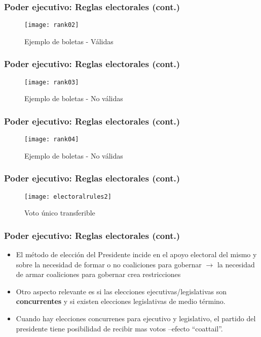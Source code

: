 \documentclass[14pt,aspectratio=169]{beamer}
\begin{document}
  \begin{frame}\frametitle{Poder ejecutivo: Reglas electorales (cont.)}
  \begin{figure}[htbp]\vspace{0cm}
    \centering
    \texttt{[image: rank02]}
    \caption{Ejemplo de boletas - Válidas}
    \label{fig:1}
  \end{figure}
  \end{frame}


  
  \begin{frame}\frametitle{Poder ejecutivo: Reglas electorales (cont.)}
  \begin{figure}[htbp]\vspace{0cm}
    \centering
    \texttt{[image: rank03]}
    \caption{Ejemplo de boletas - No válidas}
    \label{fig:1}
  \end{figure}
  \end{frame}

  

  \begin{frame}\frametitle{Poder ejecutivo: Reglas electorales (cont.)}
 \begin{figure}[htbp]\vspace{0cm}
    \centering
    \texttt{[image: rank04]}
    \caption{Ejemplo de boletas - No válidas}
    \label{fig:1}
  \end{figure}
        \end{frame}



  \begin{frame}\frametitle{Poder ejecutivo: Reglas electorales (cont.)}
 \begin{figure}[htbp]\vspace{0cm}
    \centering
    \texttt{[image: electoralrules2]}
    \caption{Voto único transferible}
    \label{fig:1}
  \end{figure}
        \end{frame}
        

 \begin{frame}\frametitle{Poder ejecutivo: Reglas electorales (cont.)}
  \begin{itemize}
  \item El método de elección del Presidente incide en el apoyo
    electoral del mismo y sobre la necesidad de formar o no
    coaliciones para gobernar $\longrightarrow$ la necesidad de armar
    coaliciones para gobernar crea restricciones 
    \item Otro aspecto relevante es si las elecciones
      ejecutivas/legislativas son \textbf{concurrentes} y si existen
      elecciones legislativas de medio término.
      \item Cuando hay elecciones concurrenes para ejecutivo y
        legislativo, el partido del presidente tiene posibilidad de
        recibir mas votos --efecto ``coattail''.
      \end{itemize}
      \end{frame}
\end{document}
